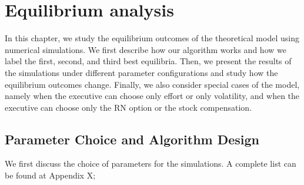 \section{Equilibrium analysis}
In this chapter, we study the equilibrium outcomes of the theoretical model using numerical simulations. We first describe how our algorithm works and how we label the first, second, and third best equilibria. Then, we present the results of the simulations under different parameter configurations and study how the equilibrium outcomes change. %
Finally, we also consider special cases of the model, namely when the executive can choose only effort or only volatility, and when the executive can choose only the RN option or the stock compensation. %


\subsection*{Parameter Choice and Algorithm Design}
We first discuss the choice of parameters for the simulations. A complete list can be found at Appendix X; %

